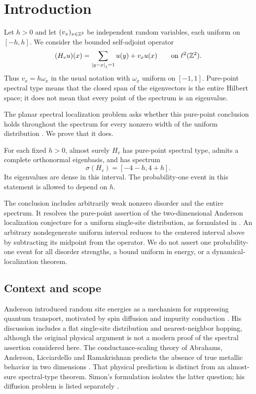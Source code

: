 \section{Introduction}

Let $h>0$ and let $(v_x)_{x\in\mathbb Z^2}$ be independent random variables,
each uniform on $[-h,h]$. We consider the bounded self-adjoint operator
\begin{equation}\label{setup:model}
 (H_v u)(x)=\sum_{\left\lvert y-x\right\rvert_1=1}u(y)+v_xu(x)
 \qquad\text{on }\ell^2(\mathbb Z^2).
\end{equation}
Thus $v_x=h\omega_x$ in the usual notation with $\omega_x$ uniform on
$[-1,1]$. Pure-point spectral type means that the closed span of the
eigenvectors is the entire Hilbert space; it does not mean that every
point of the spectrum is an eigenvalue.

The planar spectral localization problem asks whether this pure-point
conclusion holds throughout the spectrum for every nonzero width of the
uniform distribution \cite[Example~2.1 and Problem~2]{Simon2000}.
We prove that it does.

\begin{theorem}\label{main:theorem}
For each fixed $h>0$, almost surely $H_v$ has pure-point spectral type,
admits a complete orthonormal eigenbasis, and has spectrum
\[
 \sigma(H_v)=[-4-h,4+h].
\]
Its eigenvalues are dense in this interval. The probability-one event
in this statement is allowed to depend on $h$.
\end{theorem}

The conclusion includes arbitrarily weak nonzero disorder and the entire
spectrum. It resolves the pure-point assertion of the two-dimensional
Anderson localization conjecture for a uniform single-site distribution,
as formulated in \cite[Problem~2]{Simon2000}. An arbitrary nondegenerate
uniform interval reduces to the centered interval above by subtracting
its midpoint from the operator. We do not assert one probability-one
event for all disorder strengths, a bound uniform in energy, or a
dynamical-localization theorem.

\subsection*{Context and scope}
Anderson introduced random site energies as a mechanism for suppressing
quantum transport, motivated by spin diffusion and impurity conduction
\cite{Anderson1958}. His discussion includes a flat single-site
distribution and nearest-neighbor hopping, although the original
physical argument is not a modern proof of the spectral assertion
considered here. The conductance-scaling theory of Abrahams, Anderson,
Licciardello and Ramakrishnan predicts the absence of true metallic
behavior in two dimensions
\cite{AbrahamsAndersonLicciardelloRamakrishnan1979}. That physical
prediction is distinct from an almost-sure spectral-type theorem.
Simon's formulation isolates the latter question; his diffusion
problem is listed separately \cite{Simon2000}.

